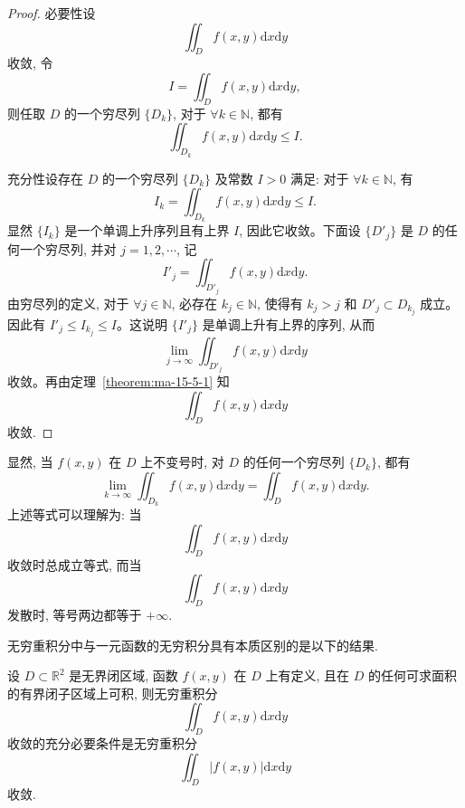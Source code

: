 \begin{proof}
必要性\quad 设
\[
  \iint_D f(x,y)\mathrm dx\mathrm dy
\]
收敛, 令
\[
  I=\iint_D f(x,y)\mathrm dx\mathrm dy,
\]
则任取 $D$ 的一个穷尽列 $\{D_k\}$, 对于 $\forall k\in\mathbb N$, 都有
\[
  \iint_{D_k}f(x,y)\mathrm dx\mathrm dy\leqslant I.
\]

充分性\quad 设存在 $D$ 的一个穷尽列 $\{D_k\}$ 及常数 $I>0$ 满足: 对于 $\forall k\in\mathbb N$, 有
\[
  I_k=\iint_{D_k}f(x,y)\mathrm dx\mathrm dy\leqslant I.
\]
显然 $\{I_k\}$ 是一个单调上升序列且有上界 $I$, 因此它收敛。下面设 $\{D'_j\}$ 是 $D$ 的任何一个穷尽列, 并对 $j=1,2,\cdots$, 记
\[
  I'_j=\iint_{D'_j}f(x,y)\mathrm dx\mathrm dy.
\]
由穷尽列的定义, 对于 $\forall j\in\mathbb N$, 必存在 $k_j\in\mathbb N$, 使得有 $k_j>j$ 和 $D'_j\subset D_{k_j}$ 成立。因此有 $I'_j\leqslant I_{k_j}\leqslant I$。这说明 $\{I'_j\}$ 是单调上升有上界的序列, 从而
\[
  \lim_{j\to\infty}\iint_{D'_j}f(x,y)\mathrm dx\mathrm dy
\]
收敛。再由定理~\ref{theorem:ma-15-5-1} 知
\[
  \iint_D f(x,y)\mathrm dx\mathrm dy
\]
收敛.
\end{proof}


\begin{remark}\label{remark:ma-15-source-74}
显然, 当 $f(x,y)$ 在 $D$ 上不变号时, 对 $D$ 的任何一个穷尽列 $\{D_k\}$, 都有
\[
  \lim_{k\to\infty}\iint_{D_k}f(x,y)\mathrm dx\mathrm dy
  =\iint_D f(x,y)\mathrm dx\mathrm dy.
\]
上述等式可以理解为: 当
\[
  \iint_D f(x,y)\mathrm dx\mathrm dy
\]
收敛时总成立等式, 而当
\[
  \iint_D f(x,y)\mathrm dx\mathrm dy
\]
发散时, 等号两边都等于 $+\infty$.
\end{remark}

无穷重积分中与一元函数的无穷积分具有本质区别的是以下的结果.

\begin{theorem}\label{theorem:ma-15-5-3}
设 $D\subset\mathbb R^2$ 是无界闭区域, 函数 $f(x,y)$ 在 $D$ 上有定义, 且在 $D$ 的任何可求面积的有界闭子区域上可积, 则无穷重积分
\[
  \iint_D f(x,y)\mathrm dx\mathrm dy
\]
收敛的充分必要条件是无穷重积分
\[
  \iint_D |f(x,y)|\mathrm dx\mathrm dy
\]
收敛.
\end{theorem}


